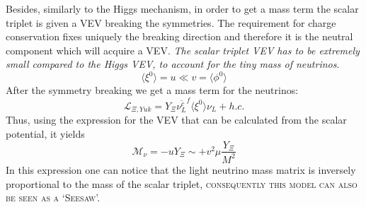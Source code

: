 Besides, similarly to the Higgs mechanism, in order to get a mass term the scalar triplet is given a VEV breaking the symmetries. The requirement for charge conservation fixes uniquely the breaking direction and therefore it is the neutral component which will acquire a VEV. \textit{The scalar triplet VEV has to be extremely small compared to the Higgs VEV, to account for the tiny mass of neutrinos}. 
\begin{equation}
    \langle \xi^0\rangle = u \ll v = \langle \phi^0 \rangle
\end{equation}
After the symmetry breaking we get a mass term for the neutrinos:
\begin{equation}
    \mathcal{L}_{\Xi, Yuk} =  Y_{\Xi} \overline{\nu^c _L}^f \langle \xi^0\rangle \nu_L  + h.c.
\end{equation}
Thus, using the expression for the VEV that can be calculated from the scalar
potential, it yields
\begin{equation}
    \mathcal{M}_\nu = - uY_{\Xi} \sim +v^2 \mu \frac{Y_{\Xi}}{M^2}
\end{equation}
In this expression one can notice that the light neutrino mass matrix is inversely
proportional to the mass of the scalar triplet, \textsc{consequently this model can also be seen as a `Seesaw'.}